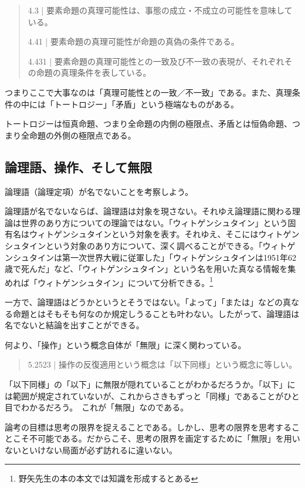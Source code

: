 \documentclass[11pt,a4paper,onecolumn,article]{jarticle}
\newcounter{ct}               %
\begin{document}
{\begin{quote}
  4.3 | 要素命題の真理可能性は、事態の成立・不成立の可能性を意味している。

  4.41 | 要素命題の真理可能性が命題の真偽の条件である。

  4.431 | 要素命題の真理可能性との一致及び不一致の表現が、それぞれその命題の真理条件を表している。
\end{quote}

つまりここで大事なのは「真理可能性との一致／不一致」である。また、真理条件の中には「トートロジー」「矛盾」という極端なものがある。

トートロジーは恒真命題、つまり全命題の内側の極限点、矛盾とは恒偽命題、つまり全命題の外側の極限点である。

\subsection{論理語、操作、そして無限}

論理語（論理定項）が名でないことを考察しよう。

論理語が名でないならば、論理語は対象を現さない。それゆえ論理語に関わる理論は世界のあり方についての理論ではない。「ウィトゲンシュタイン」という固有名はウィトゲンシュタインという対象を表す。それゆえ、そこにはウィトゲンシュタインという対象のあり方について、深く調べることができる。「ウィトゲンシュタインは第一次世界大戦に従軍した」「ウィトゲンシュタインは1951年62歳で死んだ」など、「ウィトゲンシュタイン」という名を用いた真なる情報を集めれば「ウィトゲンシュタイン」について分析できる。\footnote{野矢先生の本の本文では知識を形成するとある}

一方で、論理語はどうかというとそうではない。「よって」「または」などの真なる命題とはそもそも何なのか規定しうることも叶わない。したがって、論理語は名でないと結論を出すことができる。

何より、「操作」という概念自体が「無限」に深く関わっている。

\begin{quote}
  5.2523 | 操作の反復適用という概念は「以下同様」という概念に等しい。
\end{quote}

「以下同様」の「以下」に無限が隠れていることがわかるだろうか。「以下」には範囲が規定されていないが、これからさきもずっと「同様」であることがひと目でわかるだろう。 これが「無限」なのである。

論考の目標は思考の限界を捉えることである。しかし、思考の限界を思考することこそ不可能である。だからこそ、思考の限界を画定するために「無限」を用いないといけない局面が必ず訪れるに違いない。

}
\end{document}
